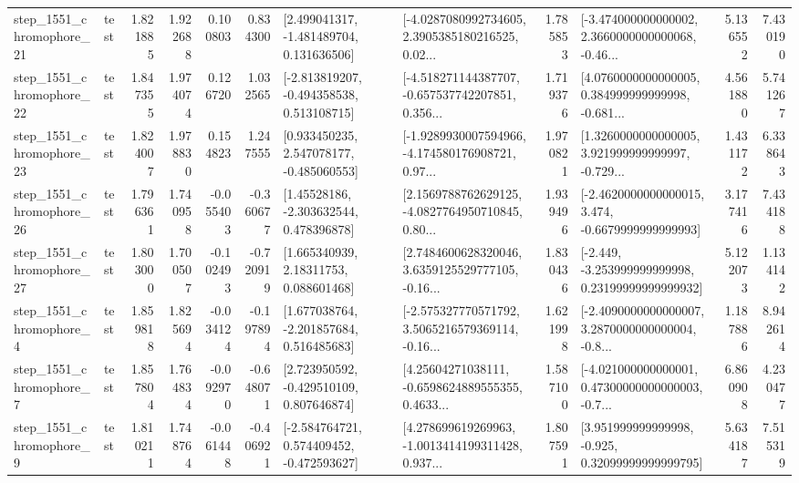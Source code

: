 \begin{tabular}{llrrrrllrlrr}
 step\_1551\_chromophore\_21 &      test &      1.821885 &    1.922688 &      0.100803 &  0.834300 &    [2.499041317, -1.481489704, 0.131636506] &  [-4.0287080992734605, 2.3905385180216525, 0.02... &       1.785853 &  [-3.474000000000002, 2.3660000000000068, -0.46... &            5.136552 &          7.430190 \\
 step\_1551\_chromophore\_22 &      test &      1.847355 &    1.974074 &      0.126720 &  1.032565 &   [-2.813819207, -0.494358538, 0.513108715] &  [-4.518271144387707, -0.657537742207851, 0.356... &       1.719376 &  [4.0760000000000005, 0.384999999999998, -0.681... &            4.561880 &          5.741267 \\
 step\_1551\_chromophore\_23 &      test &      1.824007 &    1.978830 &      0.154823 &  1.247555 &    [0.933450235, 2.547078177, -0.485060553] &  [-1.9289930007594966, -4.174580176908721, 0.97... &       1.970821 &  [1.3260000000000005, 3.921999999999997, -0.729... &            1.431172 &          6.338643 \\
 step\_1551\_chromophore\_26 &      test &      1.796361 &    1.740958 &     -0.055403 & -0.360677 &     [1.45528186, -2.303632544, 0.478396878] &  [2.1569788762629125, -4.0827764950710845, 0.80... &       1.939496 &  [-2.4620000000000015, 3.474, -0.6679999999999993] &            3.177416 &          7.434188 \\
 step\_1551\_chromophore\_27 &      test &      1.803000 &    1.700507 &     -0.102493 & -0.720919 &      [1.665340939, 2.18311753, 0.088601468] &  [2.7484600628320046, 3.6359125529777105, -0.16... &       1.830436 &  [-2.449, -3.253999999999998, 0.23199999999999932] &            5.122073 &          1.134142 \\
  step\_1551\_chromophore\_4 &      test &      1.859818 &    1.825694 &     -0.034124 & -0.197894 &    [1.677038764, -2.201857684, 0.516485683] &  [-2.575327770571792, 3.5065216579369114, -0.16... &       1.621998 &  [-2.4090000000000007, 3.2870000000000004, -0.8... &            1.187886 &          8.942614 \\
  step\_1551\_chromophore\_7 &      test &      1.857804 &    1.764834 &     -0.092970 & -0.648071 &    [2.723950592, -0.429510109, 0.807646874] &  [4.25604271038111, -0.6598624889555355, 0.4633... &       1.587100 &  [-4.021000000000001, 0.47300000000000003, -0.7... &            6.860908 &          4.230477 \\
  step\_1551\_chromophore\_9 &      test &      1.810211 &    1.748764 &     -0.061448 & -0.406921 &   [-2.584764721, 0.574409452, -0.472593627] &  [4.278699619269963, -1.0013414199311428, 0.937... &       1.807591 &   [3.951999999999998, -0.925, 0.32099999999999795] &            5.634187 &          7.515319 \\

\end{tabular}
